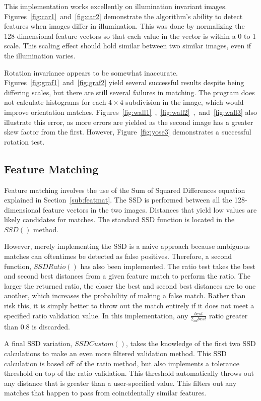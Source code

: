 \documentclass[12pt,journal,compsoc]{IEEEtran}
\begin{document}
This implementation works excellently on illumination invariant images. Figures~\ref{fig:car1}~and~\ref{fig:car2} demonstrate the algorithm's ability to detect features when images differ in illumination. This was done by normalizing the 128-dimensional feature vectors so that each value in the vector is within a 0 to 1 scale. This scaling effect should hold similar between two similar images, even if the illumination varies.

Rotation invariance appears to be somewhat inaccurate. Figures~\ref{fig:graf1}~and~\ref{fig:graf2} yield several successful results despite being differing scales, but there are still several failures in matching. The program does not calculate histograms for each $4 \times 4$ subdivision in the image, which would improve orientation matches. Figures~\ref{fig:wall1}~,~\ref{fig:wall2}~,~and~\ref{fig:wall3} also illustrate this error, as more errors are yielded as the second image has a greater skew factor from the first. However, Figure~\ref{fig:yose3} demonstrates a successful rotation test.



\subsection{Feature Matching}
Feature matching involves the use of the Sum of Squared Differences equation explained in Section~\ref{sub:featmat}. The SSD is performed between all the 128-dimensional feature vectors in the two images. Distances that yield low values are likely candidates for matches. The standard SSD function is located in the $SSD()$ method.

However, merely implementing the SSD is a naive approach because ambiguous matches can oftentimes be detected as false positives. Therefore, a second function, $SSDRatio()$ has also been implemented. The ratio test takes the best and second best distances from a given feature match to perform the ratio. The larger the returned ratio, the closer the best and second best distances are to one another, which increases the probability of making a false match. Rather than risk this, it is simply better to throw out the match entirely if it does not meet a specified ratio validation value. In this implementation, any $\frac{best}{2_{nd} best}$ ratio greater than $0.8$ is discarded.

A final SSD variation, $SSDCustom()$, takes the knowledge of the first two SSD calculations to make an even more filtered validation method. This SSD calculation is based off of the ratio method, but also implements a tolerance threshold on top of the ratio validation. This threshold automatically throws out any distance that is greater than a user-specified value. This filters out any matches that happen to pass from coincidentally similar features.
\end{document}
